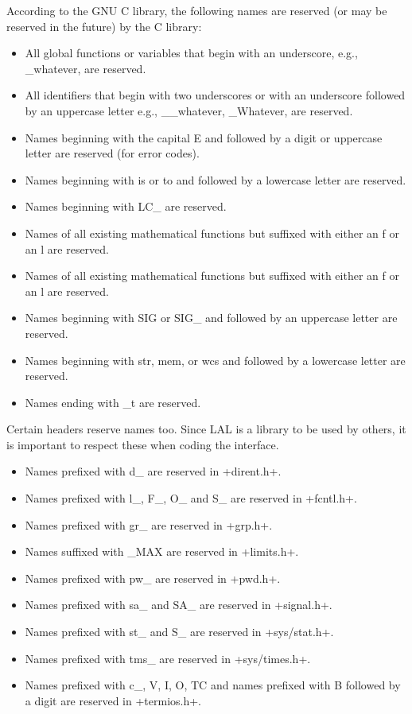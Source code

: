\documentclass[10pt]{ligodcc}
\makeatletter
\def\verb{\relax\ifmmode\hbox\else\leavevmode\null\fi
  \bgroup
    \color{blue}\small
    \verb@eol@error \let\do\@makeother \dospecials
    \verbatim@font\@noligs
    \@ifstar\@sverb\@verb}
\renewcommand{\texttt}[1]{{\ttfamily\color{blue}#1}}
\makeatother
\begin{document}
According to the GNU C library, the following names are reserved (or may be
reserved in the future) by the C library:
\begin{itemize}
\item All global functions or variables that begin with an underscore,
e.g., \texttt{\_whatever}, are reserved.
\item All identifiers that begin with two underscores or with an underscore
followed by an uppercase letter
e.g., \texttt{\_\_whatever}, \texttt{\_Whatever}, are reserved.
\item Names beginning with the capital \texttt{E} and followed by a digit
or uppercase letter are reserved (for error codes).
\item Names beginning with \texttt{is} or \texttt{to} and followed by a
lowercase letter are reserved.
\item Names beginning with \texttt{LC\_} are reserved.
\item Names of all existing mathematical functions but suffixed with either
an \texttt{f} or an \texttt{l} are reserved.
\item Names of all existing mathematical functions but suffixed with either
an \texttt{f} or an \texttt{l} are reserved.
\item Names beginning with \texttt{SIG} or \texttt{SIG\_} and followed by
an uppercase letter are reserved.
\item Names beginning with \texttt{str}, \texttt{mem}, or \texttt{wcs} and
followed by a lowercase letter are reserved.
\item Names ending with \texttt{\_t} are reserved.
\end{itemize}

Certain headers reserve names too.  Since LAL is a library to be used by
others, it is important to respect these when coding the interface.
\begin{itemize}
\item Names prefixed with \texttt{d\_} are reserved in \verb+dirent.h+.
\item Names prefixed with \texttt{l\_}, \texttt{F\_}, \texttt{O\_} and
\texttt{S\_} are reserved in \verb+fcntl.h+.
\item Names prefixed with \texttt{gr\_} are reserved in \verb+grp.h+.
\item Names suffixed with \texttt{\_MAX} are reserved in \verb+limits.h+.
\item Names prefixed with \texttt{pw\_} are reserved in \verb+pwd.h+.
\item Names prefixed with \texttt{sa\_} and \texttt{SA\_} are reserved
in \verb+signal.h+.
\item Names prefixed with \texttt{st\_} and \texttt{S\_} are reserved in
\verb+sys/stat.h+.
\item Names prefixed with \texttt{tms\_} are reserved in \verb+sys/times.h+.
\item Names prefixed with \texttt{c\_}, \texttt{V}, \texttt{I}, \texttt{O},
\texttt{TC} and names prefixed with \texttt{B} followed by a digit are reserved
in \verb+termios.h+.
\end{itemize}
\end{document}
